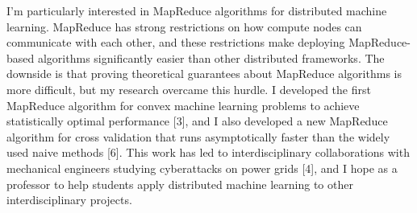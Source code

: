 \documentclass[12pt]{article}
\newcommand{\fixme}[1]{\textcolor{red}{#1}}
\begin{document}
I'm particularly interested in MapReduce algorithms for distributed machine learning.
MapReduce has strong restrictions on how compute nodes can communicate with each other, and
these restrictions make deploying MapReduce-based algorithms significantly easier than other distributed frameworks.
The downside is that proving theoretical guarantees about MapReduce algorithms is more difficult,
but my research overcame this hurdle.
I developed the first MapReduce algorithm for convex machine learning problems to achieve statistically optimal performance [3], and 
I also developed a new MapReduce algorithm for cross validation that runs asymptotically faster than the widely used naive methods [6].
This work has led to interdisciplinary collaborations with mechanical engineers studying cyberattacks on power grids [4],
and I hope as a professor to help students apply distributed machine learning to other interdisciplinary projects.

\end{document}
